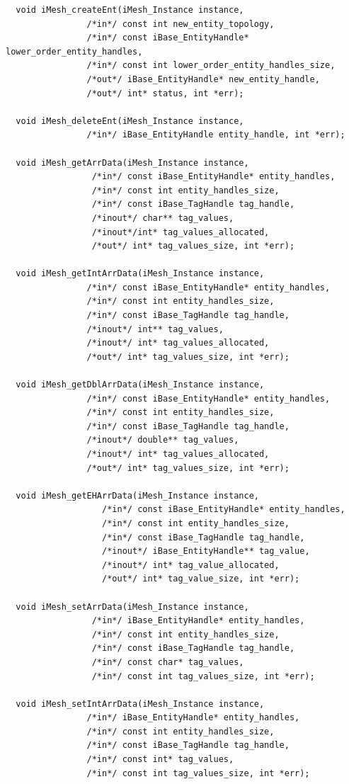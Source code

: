 \documentclass{article}
\begin{document}
\begin{small}
\begin{verbatim}
  void iMesh_createEnt(iMesh_Instance instance,
			    /*in*/ const int new_entity_topology,
			    /*in*/ const iBase_EntityHandle* lower_order_entity_handles,
			    /*in*/ const int lower_order_entity_handles_size,
			    /*out*/ iBase_EntityHandle* new_entity_handle,
			    /*out*/ int* status, int *err);

  void iMesh_deleteEnt(iMesh_Instance instance,
			    /*in*/ iBase_EntityHandle entity_handle, int *err);

  void iMesh_getArrData(iMesh_Instance instance,
			     /*in*/ const iBase_EntityHandle* entity_handles,
			     /*in*/ const int entity_handles_size,
			     /*in*/ const iBase_TagHandle tag_handle,
			     /*inout*/ char** tag_values,
			     /*inout*/int* tag_values_allocated,
			     /*out*/ int* tag_values_size, int *err);

  void iMesh_getIntArrData(iMesh_Instance instance,
				/*in*/ const iBase_EntityHandle* entity_handles,
				/*in*/ const int entity_handles_size,
				/*in*/ const iBase_TagHandle tag_handle,
				/*inout*/ int** tag_values,
				/*inout*/ int* tag_values_allocated,
				/*out*/ int* tag_values_size, int *err);

  void iMesh_getDblArrData(iMesh_Instance instance,
				/*in*/ const iBase_EntityHandle* entity_handles,
				/*in*/ const int entity_handles_size,
				/*in*/ const iBase_TagHandle tag_handle,
				/*inout*/ double** tag_values,
				/*inout*/ int* tag_values_allocated,
				/*out*/ int* tag_values_size, int *err);

  void iMesh_getEHArrData(iMesh_Instance instance,
			       /*in*/ const iBase_EntityHandle* entity_handles,
			       /*in*/ const int entity_handles_size,
			       /*in*/ const iBase_TagHandle tag_handle,
			       /*inout*/ iBase_EntityHandle** tag_value,
			       /*inout*/ int* tag_value_allocated,
			       /*out*/ int* tag_value_size, int *err);

  void iMesh_setArrData(iMesh_Instance instance,
			     /*in*/ iBase_EntityHandle* entity_handles,
			     /*in*/ const int entity_handles_size,
			     /*in*/ const iBase_TagHandle tag_handle,
			     /*in*/ const char* tag_values,
			     /*in*/ const int tag_values_size, int *err);

  void iMesh_setIntArrData(iMesh_Instance instance,
				/*in*/ iBase_EntityHandle* entity_handles,
				/*in*/ const int entity_handles_size,
				/*in*/ const iBase_TagHandle tag_handle,
				/*in*/ const int* tag_values,
				/*in*/ const int tag_values_size, int *err);


\end{verbatim}
\end{small}
\end{document}
